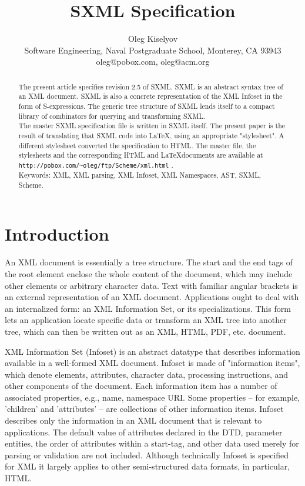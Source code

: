 \documentclass[10pt]{article}
\begin{document}
\title{SXML Specification}
\author{Oleg Kiselyov\\Software Engineering, Naval Postgraduate School, Monterey, CA 93943\\oleg@pobox.com, oleg@acm.org}
\maketitle
\begin{abstract}
The present article specifies revision 2.5 of SXML. SXML is an abstract syntax tree of an XML document. SXML is also
a concrete representation of the XML Infoset in the form of
S-expressions. The generic tree structure of SXML lends itself to a
compact library of combinators for querying and transforming SXML.\\The master SXML specification file is written in SXML itself. The present paper is the result of translating that SXML code into \LaTeX, using an appropriate "stylesheet". A different stylesheet converted the specification to HTML. The master file, the stylesheets and the corresponding HTML and \LaTeX documents are available at  \texttt{http://pobox.com/\textasciitilde{}oleg/ftp/Scheme/xml.html} .\\Keywords: XML, XML parsing, XML Infoset, XML Namespaces, AST, SXML, Scheme.\end{abstract}
\section{Introduction}
An XML document is essentially a tree structure. The start and the end
tags of the root element enclose the whole content of the document,
which may include other elements or arbitrary character data.  Text
with familiar angular brackets is an external representation of an XML
document. Applications ought to deal with an internalized form:
an XML Information Set, or its specializations.  This form lets an
application locate specific data or transform an XML tree into another
tree, which can then be written out as an XML, HTML, PDF, etc.
document.

XML Information Set (Infoset) \cite{XML Infoset} is an
abstract datatype that describes information available in a
well-formed XML document.  Infoset is made of "information items",
which denote elements, attributes, character data, processing
instructions, and other components of the document. Each information
item has a number of associated properties, e.g., name, namespace
URI. Some properties -- for example, 'children' and 'attributes' --
are collections of other information items. Infoset describes
only the information in an XML document that is relevant to
applications. The default value of attributes declared in the DTD, parameter
entities, the order of attributes within a start-tag, and other data used merely for parsing or validation are not included. Although technically 
Infoset is specified for XML it largely applies to other semi-structured data formats, in particular, HTML.
\end{document}
